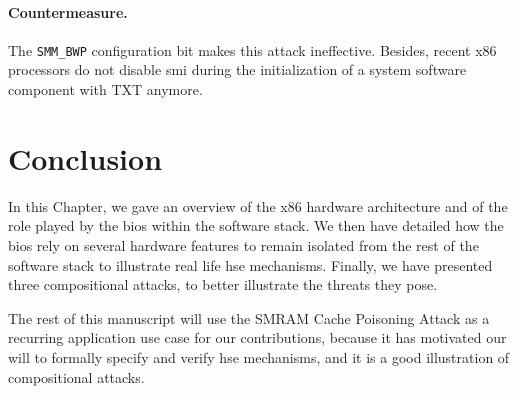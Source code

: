 \paragraph{Countermeasure.}
%
The \texttt{SMM\_BWP} configuration bit makes this attack ineffective.
%
Besides, recent x86 processors do not disable \ac{smi} during the initialization of a
system software component with TXT anymore.

\section{Conclusion}
\label{sec:usecase:conclusion}

In this Chapter, we gave an overview of the x86 hardware architecture and of the
role played by the \ac{bios} within the software stack.
%
We then have detailed how the \ac{bios} rely on several hardware features to
remain isolated from the rest of the software stack to illustrate real life
\ac{hse} mechanisms.
%
Finally, we have presented three compositional attacks, to better illustrate
the threats they pose.

The rest of this manuscript will use the SMRAM Cache Poisoning Attack as a
recurring application use case for our contributions, because it has motivated
our will to formally specify and verify \ac{hse} mechanisms, and it is a good
illustration of compositional attacks.
